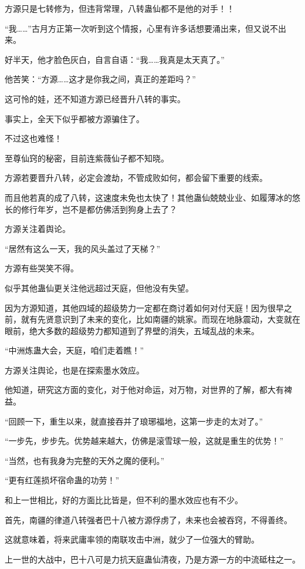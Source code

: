 \begin{this_body}
方源只是七转修为，但违背常理，八转蛊仙都不是他的对手！！

“我……”古月方正第一次听到这个情报，心里有许多话想要涌出来，但又说不出来。

好半天，他才脸色灰白，自言自语：“我……我真是太天真了。”

他苦笑：“方源……这才是你我之间，真正的差距吗？”

这可怜的娃，还不知道方源已经晋升八转的事实。

事实上，全天下似乎都被方源骗住了。

不过这也难怪！

至尊仙窍的秘密，目前连紫薇仙子都不知晓。

方源若要晋升八转，必定会渡劫，不管成败如何，都会留下重要的线索。

而且他若真的成了八转，这速度未免也太快了！其他蛊仙兢兢业业、如履薄冰的悠长的修行年岁，岂不是都仿佛活到狗身上去了？

方源关注着舆论。

“居然有这么一天，我的风头盖过了天梯？”

方源有些哭笑不得。

似乎其他蛊仙更关注他远超过天庭，但他没有失望。

因为方源知道，其他四域的超级势力一定都在商讨着如何对付天庭！因为很早之前，就有先贤意识到了未来的变化，比如南疆的姚家。而现在地脉震动，大变就在眼前，绝大多数的超级势力都知道到了界壁的消失，五域乱战的未来。

“中洲炼蛊大会，天庭，咱们走着瞧！”

方源关注舆论，也是在探索墨水效应。

他知道，研究这方面的变化，对于他对命运，对万物，对世界的了解，都大有裨益。

“回顾一下，重生以来，就直接吞并了琅琊福地，这第一步走的太对了。”

“一步先，步步先。优势越来越大，仿佛是滚雪球一般，这就是重生的优势！”

“当然，也有我身为完整的天外之魔的便利。”

“更有红莲损坏宿命蛊的功劳！”

和上一世相比，好的方面比比皆是，但不利的墨水效应也有不少。

首先，南疆的律道八转强者巴十八被方源俘虏了，未来也会被吞窍，不得善终。

这就意味着，将来武庸率领的南联攻击中洲，就少了一位强大的臂助。

上一世的大战中，巴十八可是力抗天庭蛊仙清夜，乃是方源一方的中流砥柱之一。


\end{this_body}

